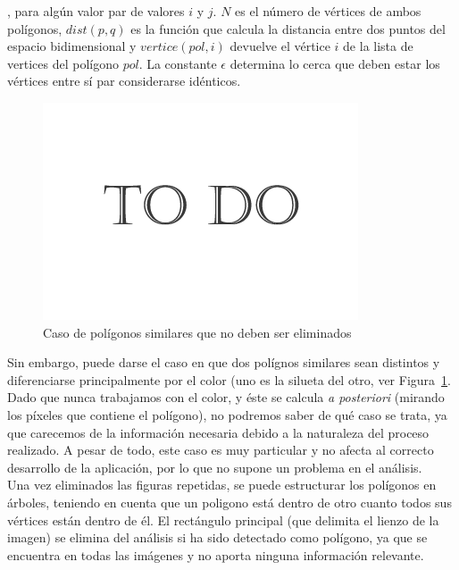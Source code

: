 {	, para algún valor par de valores $i$ y $j$. $N$ es el número de vértices de ambos polígonos, $dist(p,q)$ es la función que calcula la distancia entre dos puntos del espacio bidimensional y $vertice(pol, i)$ devuelve el vértice $i$ de la lista de vertices del polígono $pol$. La constante $\epsilon$ determina lo cerca que deben estar los vértices entre sí par considerarse idénticos. \\
	
		\begin{figure}[htbp]
		\centering
		\hspace*{-0.3in}
		\includegraphics[scale=0.47]{graphics/todo.png}
		\caption{Caso de polígonos similares que no deben ser eliminados}
		\label{fig:colorsimilares}
		\end{figure}
	
	Sin embargo, puede darse el caso en que dos polígnos similares sean distintos y diferenciarse principalmente por el color (uno es la silueta del otro, ver Figura~\ref{fig:colorsimilares}. Dado que nunca trabajamos con el color, y éste se calcula \emph{a posteriori} (mirando los píxeles que contiene el polígono), no podremos saber de qué caso se trata, ya que carecemos de la información necesaria debido a la naturaleza del proceso realizado. A pesar de todo, este caso es muy particular y no afecta al correcto desarrollo de la aplicación, por lo que no supone un problema en el análisis.\\
	
	Una vez eliminados las figuras repetidas, se puede estructurar los polígonos en árboles, teniendo en cuenta que un poligono está dentro de otro cuanto todos sus vértices están dentro de él. El rectángulo principal (que delimita el lienzo de la imagen) se elimina del análisis si ha sido detectado como polígono, ya que se encuentra en todas las imágenes y no aporta ninguna información relevante.\\
	
}
